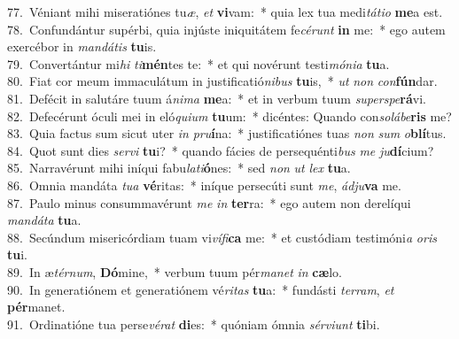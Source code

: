 {77.~}Véniant mihi miseratiónes tu\textit{æ}, \textit{et} \textbf{vi}vam:~* quia lex tua medi\textit{tá}\textit{ti}\textit{o} \textbf{me}a est.\\
{78.~}Confundántur supérbi, quia injúste iniquitátem fe\textit{cé}\textit{runt} \textbf{in} me:~* ego autem exercébor in \textit{man}\textit{dá}\textit{tis} \textbf{tu}is.\\
{79.~}Convertántur mi\textit{hi} \textit{ti}\textbf{mén}tes te:~* et qui novérunt testi\textit{mó}\textit{ni}\textit{a} \textbf{tu}a.\\
{80.~}Fiat cor meum immaculátum in justificatió\textit{ni}\textit{bus} \textbf{tu}is,~* \textit{ut} \textit{non} \textit{con}\textbf{fún}dar.\\
{81.~}Defécit in salutáre tuum á\textit{ni}\textit{ma} \textbf{me}a:~* et in verbum tuum \textit{su}\textit{per}\textit{spe}\textbf{rá}vi.\\
{82.~}Defecérunt óculi mei in eló\textit{qui}\textit{um} \textbf{tu}um:~* dicéntes: Quando con\textit{so}\textit{lá}\textit{be}\textbf{ris} me?\\
{83.~}Quia factus sum sicut uter \textit{in} \textit{pru}\textbf{í}na:~* justificatiónes tuas \textit{non} \textit{sum} \textit{o}\textbf{blí}tus.\\
{84.~}Quot sunt dies \textit{ser}\textit{vi} \textbf{tu}i?~* quando fácies de persequénti\textit{bus} \textit{me} \textit{ju}\textbf{dí}cium?\\
{85.~}Narravérunt mihi iníqui fabu\textit{la}\textit{ti}\textbf{ó}nes:~* sed \textit{non} \textit{ut} \textit{lex} \textbf{tu}a.\\
{86.~}Omnia mandáta \textit{tu}\textit{a} \textbf{vé}ritas:~* iníque persecúti sunt \textit{me}, \textit{ád}\textit{ju}\textbf{va} me.\\
{87.~}Paulo minus consummavérunt \textit{me} \textit{in} \textbf{ter}ra:~* ego autem non derelíqui \textit{man}\textit{dá}\textit{ta} \textbf{tu}a.\\
{88.~}Secúndum misericórdiam tuam vi\textit{ví}\textit{fi}\textbf{ca} me:~* et custódiam testimóni\textit{a} \textit{o}\textit{ris} \textbf{tu}i.\\
{89.~}In æ\textit{tér}\textit{num}, \textbf{Dó}mine,~* verbum tuum pér\textit{ma}\textit{net} \textit{in} \textbf{cæ}lo.\\
{90.~}In generatiónem et generatiónem vé\textit{ri}\textit{tas} \textbf{tu}a:~* fundásti \textit{ter}\textit{ram}, \textit{et} \textbf{pér}manet.\\
{91.~}Ordinatióne tua perse\textit{vé}\textit{rat} \textbf{di}es:~* quóniam ómnia \textit{sér}\textit{vi}\textit{unt} \textbf{ti}bi.\\
